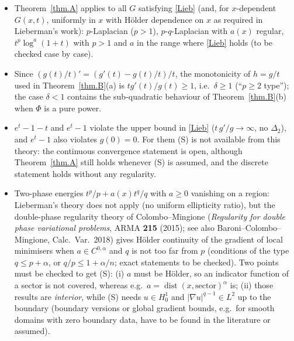 \documentclass[11pt]{amsart}
\theoremstyle{remark}
\theoremstyle{definition}
\begin{document}
\begin{itemize}
\item Theorem~\ref{thm.A} applies to all $G$ satisfying \eqref{Lieb} (and, for $x$-dependent $G(x,t)$, uniformly in $x$ with H\"older dependence on $x$ as required in Lieberman's work): $p$-Laplacian ($p>1$), $p$-$q$-Laplacian with $a(x)$ regular, $t^p\log^a(1+t)$ with $p>1$ and $a$ in the range where \eqref{Lieb} holds (to be checked case by case).
\item Since $(g(t)/t)'=(g'(t)-g(t)/t)/t$, the monotonicity of $h=g/t$ used in Theorem~\ref{thm.B}(a) is $t g'(t)/g(t)\ge1$, i.e.\ $\delta\ge1$ (``$p\ge2$ type''); the case $\delta<1$ contains the sub-quadratic behaviour of Theorem~\ref{thm.B}(b) when $\Phi$ is a pure power.
\item $e^t-1-t$ and $e^t-1$ violate the upper bound in \eqref{Lieb} ($t\,g'/g\to\infty$, no $\Delta_2$), and $e^t-1$ also violates $g(0)=0$. For them (S) is not available from this theory: the continuous convergence statement is open, although Theorem~\ref{thm.A} still holds whenever (S) is assumed, and the discrete statement holds without any regularity.
\item Two-phase energies $t^p/p+a(x)t^q/q$ with $a\ge0$ vanishing on a region: Lieberman's theory does not apply (no uniform ellipticity ratio), but the double-phase regularity theory of Colombo--Mingione (\emph{Regularity for double phase variational problems}, ARMA \textbf{215} (2015); see also Baroni--Colombo--Mingione, Calc.\ Var.\ 2018) gives H\"older continuity of the gradient of local minimisers when $a\in C^{0,\alpha}$ and $q$ is not too far from $p$ (conditions of the type $q\le p+\alpha$, or $q/p\le1+\alpha/n$; exact statements to be checked). Two points must be checked to get (S): (i) $a$ must be H\"older, so an indicator function of a sector is not covered, whereas e.g.\ $a=\operatorname{dist}(x,\text{sector})^{\alpha}$ is; (ii) those results are \emph{interior}, while (S) needs $u\in H^1_0$ and $|\nabla u|^{q-1}\in L^2$ up to the boundary (boundary versions or global gradient bounds, e.g.\ for smooth domains with zero boundary data, have to be found in the literature or assumed).
\end{itemize}
\end{document}
